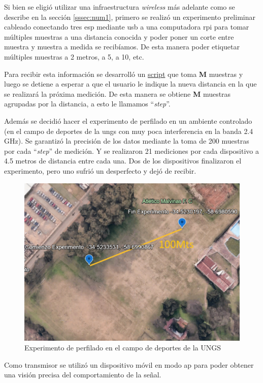 Si bien se eligió utilizar una infraestructura \textit{wireless} más adelante como se describe en la sección \ref{sssec:num1}, primero se realizó un experimento preliminar cableado conectando tres \acs{esp} mediante \acs{usb} a una computadora \acl{rpi} para tomar múltiples muestras a una distancia conocida y poder poner un corte entre muestra y muestra a medida se recibíamos. De esta manera poder etiquetar múltiples muestras a 2 metros, a 5, a 10, etc.

Para recibir esta información se desarrolló un \href{https://github.com/agusalex/PacketSnifferServer}{script} que toma \textbf{M} muestras y luego se detiene a esperar a que el usuario le indique la nueva distancia en la que se realizará la próxima medición. De esta manera se obtiene \textbf{M} muestras agrupadas por la distancia, a esto le llamamos “\textit{step}”.


Además se decidió hacer el experimento de perfilado en un ambiente controlado (en el campo de deportes de la \acs{ungs} con muy poca interferencia en la banda 2.4 GHz). Se garantizó la precisión de los datos mediante la toma de 200 muestras por cada “\textit{step}” de medición. Y se realizaron 21 mediciones por cada dispositivo a 4.5 metros de distancia entre cada una. Dos de los dispositivos finalizaron el experimento, pero uno sufrió un desperfecto y dejó de recibir.
 
\begin{figure}[!htb]
	\centering
	\includegraphics{Figuras/fieldwork/profiling.png}
	\captionsetup{margin=2cm}
	\caption[Perfilado]{Experimento de perfilado en el campo de deportes de la UNGS}
	\label{fig:arduino-profiling-setup}
\end{figure}
 Como transmisor se utilizó un dispositivo móvil en modo \acs{ap} para poder obtener una visión precisa del comportamiento de la señal.

